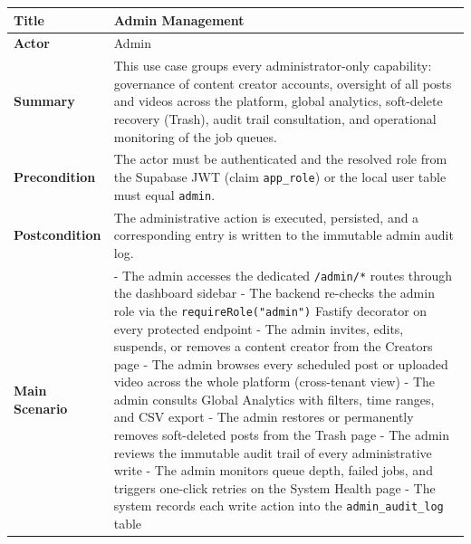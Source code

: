 \begin{table}[H]
\centering
\renewcommand{\arraystretch}{1.4}
\begin{tabular}{|p{4cm}|p{10cm}|}
\hline
\textbf{Title} & Admin Management \\ \hline

\textbf{Actor} & Admin \\ \hline

\textbf{Summary} &
This use case groups every administrator-only capability: governance of content creator accounts, oversight of all posts and videos across the platform, global analytics, soft-delete recovery (Trash), audit trail consultation, and operational monitoring of the job queues. \\ \hline

\textbf{Precondition} &
The actor must be authenticated and the resolved role from the Supabase JWT (claim \texttt{app\_role}) or the local user table must equal \texttt{admin}. \\ \hline

\textbf{Postcondition} &
The administrative action is executed, persisted, and a corresponding entry is written to the immutable admin audit log. \\ \hline

\textbf{Main Scenario} &
- The admin accesses the dedicated \texttt{/admin/*} routes through the dashboard sidebar \newline
- The backend re-checks the admin role via the \texttt{requireRole("admin")} Fastify decorator on every protected endpoint \newline
- The admin invites, edits, suspends, or removes a content creator from the Creators page \newline
- The admin browses every scheduled post or uploaded video across the whole platform (cross-tenant view) \newline
- The admin consults Global Analytics with filters, time ranges, and CSV export \newline
- The admin restores or permanently removes soft-deleted posts from the Trash page \newline
- The admin reviews the immutable audit trail of every administrative write \newline
- The admin monitors queue depth, failed jobs, and triggers one-click retries on the System Health page \newline
- The system records each write action into the \texttt{admin\_audit\_log} table \\ \hline


\end{tabular}
\end{table}
